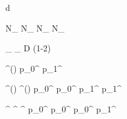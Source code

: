 
\newmathsymbol{\tagdecision}     {d}
\newmathsymbol{\tg}              {\tagdecision}
\newmathsymbol{\mistagestimate}  {\eta}
\newmathsymbol{\deltamistagestimate}{\Delta\mistagestimate}
\newmathsymbol{\mistag}          {\omega}
\newmathsymbol{\deltamistag}     {\Delta\mistag}

\newmathsymbol{\Ntagged}         {N_}
\newmathsymbol{\NRtagged}        {N_}
\newmathsymbol{\NWtagged}        {N_}
\newmathsymbol{\NUtagged}        {N_}

\newmathsymbol{\tageff}          {\eps_}
\newmathsymbol{\efftageff}       {\eps_}
\newmathsymbol{\tagdilution}     {D}
\newmathsymbol{\tagdilutionlg}   {(1-2\mistag)}

\newcommand{\p}[2]                {p_{#1}^{#2}}
\newcommand{\deltap}[2]           {\Delta p_{#1}^{#2}}
\newcommand{\omegaofeta}[1]       {\mistag^{#1}(\mistagestimate)}
\newmathsymbol{\omofeta}          {\omegaofeta{}}
\newmathsymbol{\pzero}            {\p{0}{}}
\newmathsymbol{\deltapzero}       {}
\newmathsymbol{\pone}             {\p{1}{}}
\newmathsymbol{\deltapone}        {}
\newmathsymbol{\avgmistagestimate}{\langle\mistagestimate\rangle}

\newmathsymbol{\omofetaBd}        {\omegaofeta{\Bd}}
\newmathsymbol{\omofetaBdbar}     {\omegaofeta{\Bdbar}}
\newmathsymbol{\pzeroBd}          {\p{0}{\Bd}}
\newmathsymbol{\pzeroBdbar}       {\p{0}{\Bdbar}}
\newmathsymbol{\poneBd}           {\p{1}{\Bd}}
\newmathsymbol{\poneBdbar}        {\p{1}{\Bdbar}}

\newmathsymbol{\tgos}        {\tagdecision^}
\newmathsymbol{\mistagestos} {\mistagestimate^}
\newmathsymbol{\mistagos}    {\mistag^}
\newmathsymbol{\pzeroos}     {\p{0}{}}
\newmathsymbol{\pzeroosll}   {\p{0}{}}
\newmathsymbol{\pzeroosdd}   {\p{0}{}}
\newmathsymbol{\poneos}      {\p{1}{}}
\newmathsymbol{\avgmistagestos}{\langle\mistagestos\rangle}
\newmathsymbol{\avgmistagestosll}{\langle\mistagestosll\rangle}
\newmathsymbol{\avgmistagestosdd}{\langle\mistagestosdd\rangle}


